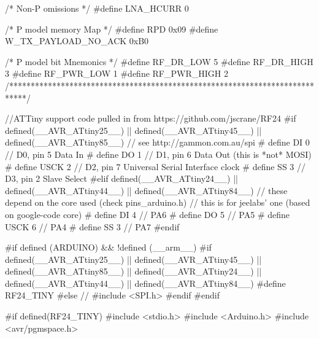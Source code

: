 \begin{DoxyCodeInclude}
\textcolor{comment}{/* Non-P omissions */}
\textcolor{preprocessor}{#define LNA\_HCURR   0}

\textcolor{comment}{/* P model memory Map */}
\textcolor{preprocessor}{#define RPD         0x09}
\textcolor{preprocessor}{#define W\_TX\_PAYLOAD\_NO\_ACK  0xB0}

\textcolor{comment}{/* P model bit Mnemonics */}
\textcolor{preprocessor}{#define RF\_DR\_LOW   5}
\textcolor{preprocessor}{#define RF\_DR\_HIGH  3}
\textcolor{preprocessor}{#define RF\_PWR\_LOW  1}
\textcolor{preprocessor}{#define RF\_PWR\_HIGH 2}
\textcolor{comment}{/****************************************************************************/}

\textcolor{comment}{//ATTiny support code pulled in from https://github.com/jscrane/RF24}
\textcolor{preprocessor}{#if defined(\_\_AVR\_ATtiny25\_\_) || defined(\_\_AVR\_ATtiny45\_\_) || defined(\_\_AVR\_ATtiny85\_\_)}
\textcolor{comment}{// see http://gammon.com.au/spi}
\textcolor{preprocessor}{#   define DI   0  // D0, pin 5  Data In}
\textcolor{preprocessor}{#   define DO   1  // D1, pin 6  Data Out (this is *not* MOSI)}
\textcolor{preprocessor}{#   define USCK 2  // D2, pin 7  Universal Serial Interface clock}
\textcolor{preprocessor}{#   define SS   3  // D3, pin 2  Slave Select}
\textcolor{preprocessor}{#elif defined(\_\_AVR\_ATtiny24\_\_) || defined(\_\_AVR\_ATtiny44\_\_) || defined(\_\_AVR\_ATtiny84\_\_)}
\textcolor{comment}{// these depend on the core used (check pins\_arduino.h)}
\textcolor{comment}{// this is for jeelabs' one (based on google-code core)}
\textcolor{preprocessor}{#   define DI   4   // PA6}
\textcolor{preprocessor}{#   define DO   5   // PA5}
\textcolor{preprocessor}{#   define USCK 6   // PA4}
\textcolor{preprocessor}{#   define SS   3   // PA7}
\textcolor{preprocessor}{#endif}

\textcolor{preprocessor}{#if defined (ARDUINO) && !defined (\_\_arm\_\_)}
\textcolor{preprocessor}{    #if defined(\_\_AVR\_ATtiny25\_\_) || defined(\_\_AVR\_ATtiny45\_\_) || defined(\_\_AVR\_ATtiny85\_\_) ||
       defined(\_\_AVR\_ATtiny24\_\_) || defined(\_\_AVR\_ATtiny44\_\_) || defined(\_\_AVR\_ATtiny84\_\_)}
\textcolor{preprocessor}{        #define RF24\_TINY}
\textcolor{preprocessor}{    #else}
\textcolor{comment}{//      #include <SPI.h>}
\textcolor{preprocessor}{    #endif}
\textcolor{preprocessor}{#endif}

\textcolor{preprocessor}{#if defined(RF24\_TINY)}
\textcolor{preprocessor}{#include <stdio.h>}
\textcolor{preprocessor}{#include <Arduino.h>}
\textcolor{preprocessor}{#include <avr/pgmspace.h>}


\end{DoxyCodeInclude}
